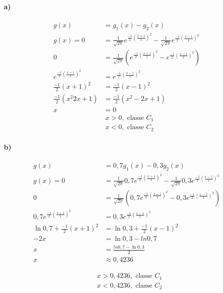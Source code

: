 \documentclass{article}
\begin{document}
    \paragraph{a)}
    \begin{align*}
        g(x) &= g_1(x) - g_2(x)\\
        g(x)=0&=\frac{1}{\sqrt{2\pi}}e^{\frac{-1}{2}(\frac{x+1}{1})^2} - \frac{1}{\sqrt{2\pi}}e^{\frac{-1}{2}(\frac{x-1}{1})^2}\\
            0&=\frac{1}{\sqrt{2\pi}}\left(e^{\frac{-1}{2}(\frac{x+1}{1})^2} - e^{\frac{-1}{2}(\frac{x-1}{1})^2}\right)\\
           e^{\frac{-1}{2}(\frac{x+1}{1})^2} &= e^{\frac{-1}{2}(\frac{x-1}{1})^2}\\
           \frac{-1}{2}(x+1)^2 &= \frac{-1}{2}(x-1)^2\\
           \frac{-1}{2}(x^2 2x+1) &= \frac{-1}{2}(x^2 -2x + 1)\\
           x&=0
    \end{align*}
    \begin{align*}
        &x>0,\text{ classe }C_1\\
        &x<0,\text{ classe }C_2
    \end{align*}    
 
    \paragraph{b)}
        \begin{align*}
        g(x) &= 0,7g_1(x) - 0,3g_2(x)\\
        g(x)=0&=\frac{1}{\sqrt{2\pi}}0,7e^{\frac{-1}{2}(\frac{x+1}{1})^2} - \frac{1}{\sqrt{2\pi}}0,3e^{\frac{-1}{2}(\frac{x-1}{1})^2}\\
            0&=\frac{1}{\sqrt{2\pi}}\left(0,7e^{\frac{-1}{2}(\frac{x+1}{1})^2} - 0,3e^{\frac{-1}{2}(\frac{x-1}{1})^2}\right)\\
           0,7e^{\frac{-1}{2}(\frac{x+1}{1})^2} &= 0,3e^{\frac{-1}{2}(\frac{x-1}{1})^2}\\
           \ln0,7 + \frac{-1}{2}(x+1)^2 &= \ln0,3 + \frac{-1}{2}(x-1)^2\\
           -2x &= \ln0,3 -ln0,7\\
           x &=  \frac{ln0,7 - \ln0,3}{2}\\
           x&\approx 0,4236
        \end{align*}
  
    \begin{align*}
        &x>0,4236,\text{ classe }C_1\\
        &x<0,4236,\text{ classe }C_2
    \end{align*}    
\end{document}
